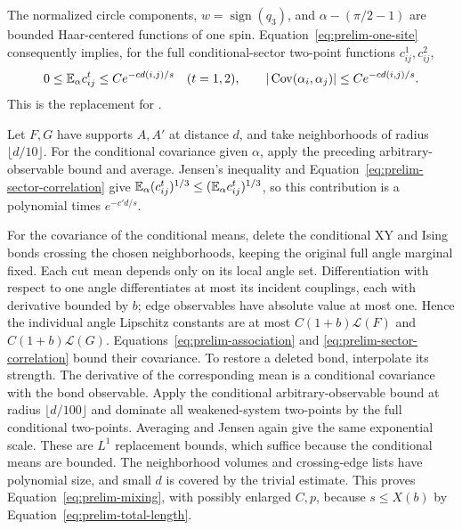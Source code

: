 The normalized circle components, $w=\operatorname{sign}(q_3)$, and
$\alpha-(\pi/2-1)$ are bounded Haar-centered functions of one spin.
Equation~\eqref{eq:prelim-one-site} consequently implies, for the full
conditional-sector two-point functions $c^1_{ij},c^2_{ij}$,
\begin{equation}
 0\le\mathbb E_\alpha c^t_{ij}\le Ce^{-cd(i,j)/s}\quad(t=1,2),
 \qquad |\operatorname{Cov}(\alpha_i,\alpha_j)|\le Ce^{-cd(i,j)/s}.
 \label{eq:prelim-sector-correlation}
\end{equation}
This is the replacement for .

Let $F,G$ have supports $A,A'$ at distance $d$, and take neighborhoods
of radius $\lfloor d/10\rfloor$. For the conditional covariance given
$\alpha$, apply the preceding arbitrary-observable bound and average.
Jensen's inequality and Equation~\eqref{eq:prelim-sector-correlation}
give $\mathbb E_\alpha(c^t_{ij})^{1/3}\le(\mathbb E_\alpha c^t_{ij})^{1/3}$,
so this contribution is a polynomial times $e^{-c'd/s}$.

For the covariance of the conditional means, delete the conditional
XY and Ising bonds crossing the chosen neighborhoods, keeping the
original full angle marginal fixed. Each cut mean depends only on its
local angle set. Differentiation with respect to one angle differentiates
at most its incident couplings, each with derivative bounded by $b$;
edge observables have absolute value at most one. Hence the individual
angle Lipschitz constants are at most
$C(1+b)\mathcal L(F)$ and $C(1+b)\mathcal L(G)$.
Equations~\eqref{eq:prelim-association} and
\eqref{eq:prelim-sector-correlation} bound their covariance.
To restore a deleted bond, interpolate its strength. The derivative
of the corresponding mean is a conditional covariance with the bond
observable. Apply the conditional arbitrary-observable bound at radius
$\lfloor d/100\rfloor$ and dominate all weakened-system two-points by
the full conditional two-points. Averaging and Jensen again give the
same exponential scale. These are $L^1$ replacement bounds, which
suffice because the conditional means are bounded.
The neighborhood volumes and crossing-edge lists have polynomial
size, and small $d$ is covered by the trivial estimate. This proves
Equation~\eqref{eq:prelim-mixing}, with possibly enlarged $C,p$, because
$s\le X(b)$ by Equation~\eqref{eq:prelim-total-length}.

